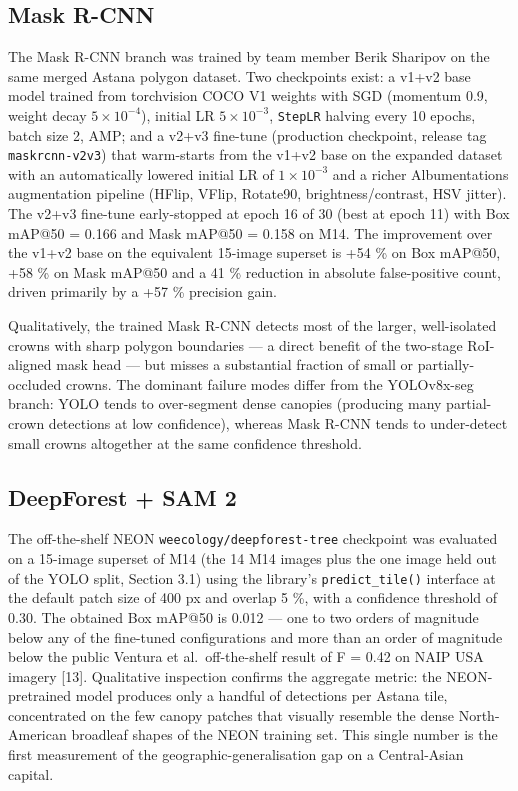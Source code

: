 \subsection{Mask R-CNN}\label{mask-r-cnn}

The Mask R-CNN branch was trained by team member Berik Sharipov on the same merged Astana polygon dataset. Two checkpoints exist: a v1+v2 base model trained from torchvision COCO V1 weights with SGD (momentum 0.9, weight decay \(5 \times 10^{-4}\)), initial LR \(5 \times 10^{-3}\), \texttt{StepLR} halving every 10 epochs, batch size 2, AMP; and a v2+v3 fine-tune (production checkpoint, release tag \texttt{maskrcnn-v2v3}) that warm-starts from the v1+v2 base on the expanded dataset with an automatically lowered initial LR of \(1 \times 10^{-3}\) and a richer Albumentations augmentation pipeline (HFlip, VFlip, Rotate90, brightness/contrast, HSV jitter). The v2+v3 fine-tune early-stopped at epoch 16 of 30 (best at epoch 11) with Box mAP@50 = 0.166 and Mask mAP@50 = 0.158 on M14. The improvement over the v1+v2 base on the equivalent 15-image superset is +54 \% on Box mAP@50, +58 \% on Mask mAP@50 and a 41 \% reduction in absolute false-positive count, driven primarily by a +57 \% precision gain.

Qualitatively, the trained Mask R-CNN detects most of the larger, well-isolated crowns with sharp polygon boundaries --- a direct benefit of the two-stage RoI-aligned mask head --- but misses a substantial fraction of small or partially-occluded crowns. The dominant failure modes differ from the YOLOv8x-seg branch: YOLO tends to over-segment dense canopies (producing many partial-crown detections at low confidence), whereas Mask R-CNN tends to under-detect small crowns altogether at the same confidence threshold.

\subsection{DeepForest + SAM 2}\label{deepforest-sam-2}

The off-the-shelf NEON \texttt{weecology/deepforest-tree} checkpoint was evaluated on a 15-image superset of M14 (the 14 M14 images plus the one image held out of the YOLO split, Section 3.1) using the library's \texttt{predict\_tile()} interface at the default patch size of 400 px and overlap 5 \%, with a confidence threshold of 0.30. The obtained Box mAP@50 is 0.012 --- one to two orders of magnitude below any of the fine-tuned configurations and more than an order of magnitude below the public Ventura et al.~off-the-shelf result of F = 0.42 on NAIP USA imagery {[}13{]}. Qualitative inspection confirms the aggregate metric: the NEON-pretrained model produces only a handful of detections per Astana tile, concentrated on the few canopy patches that visually resemble the dense North-American broadleaf shapes of the NEON training set. This single number is the first measurement of the geographic-generalisation gap on a Central-Asian capital.


